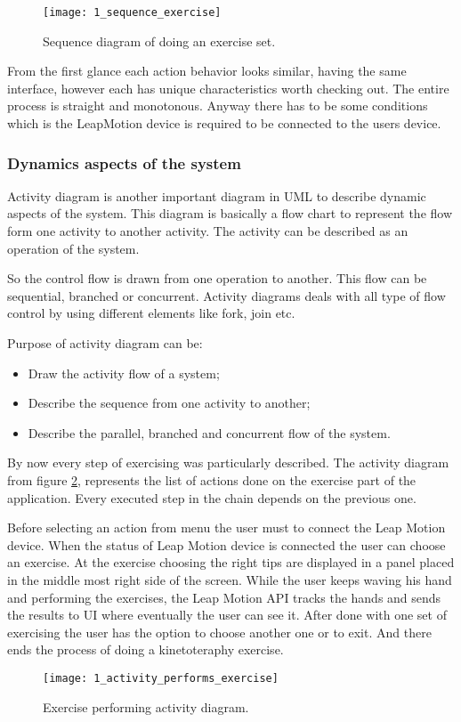 \begin{figure}[!h]
\centering
\texttt{[image: 1\_sequence\_exercise]}
\caption{Sequence diagram of doing an exercise set.}\label{sequence_exercise}
\end{figure}
From the first glance each action behavior looks similar, having the same interface, however each has unique characteristics worth checking out. The entire process is straight and monotonous. Anyway there has to be some conditions which is the LeapMotion device is required to be connected to the users device.


\subsubsection{Dynamics aspects of the system}
Activity diagram is another important diagram in UML to describe dynamic aspects of the system. This diagram is basically a flow chart to represent the flow form one activity to another activity. The activity can be described as an operation of the system.

So the control flow is drawn from one operation to another. This flow can be sequential, branched or concurrent. Activity diagrams deals with all type of flow control by using different elements like fork, join etc.


Purpose of activity diagram can be:
\begin{itemize}
\item Draw the activity flow of a system;
\item Describe the sequence from one activity to another;
\item Describe the parallel, branched and concurrent flow of the system.
\end{itemize}
\vspace{0.2cm}

By now every step of exercising was particularly described.
The activity diagram from  \mbox{figure} \ref{activity_performs}, represents the list of actions done on the exercise part of the application. Every executed step in the chain  depends on the previous one.

Before selecting an action from menu the user must to connect the Leap Motion device. When the status of Leap Motion device is connected the user can choose an exercise. At the exercise choosing the right tips are displayed in a panel placed in the middle most right side of the screen. While the user keeps waving his hand and performing the exercises, the Leap Motion API tracks the hands and sends the results to UI where eventually the user can see it. After done with one set of exercising the user has the option to choose another one or to exit. And there ends the process of doing a kinetoteraphy exercise.
\begin{figure}[!h]
\centering
\texttt{[image: 1\_activity\_performs\_exercise]}
\caption{Exercise performing activity diagram.}\label{activity_performs}
\end{figure}


